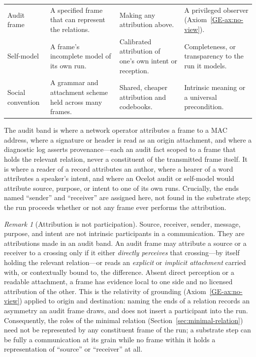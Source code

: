 \documentclass[11pt,a4paper]{article}
\theoremstyle{remark}\newtheorem{remark}[definition]{Remark}
\begin{document}
\begin{table}[t]
\begin{tabular}{@{}>{\raggedright\arraybackslash}p{}>{\raggedright\arraybackslash}p{}>{\raggedright\arraybackslash}p{}>{\raggedright\arraybackslash}p{}@{}}
Audit frame & A specified frame that can represent the relations. & Making any attribution above. & A privileged observer (Axiom~\ref{GE-ax:no-view}).\\
Self-model & A frame's incomplete model of its own run. & Calibrated attribution of one's own intent or reception. & Completeness, or transparency to the run it models.\\
Social convention & A grammar and attachment scheme held across many frames. & Shared, cheaper attribution and codebooks. & Intrinsic meaning or a universal precondition.\\
\bottomrule
\end{tabular}
\end{table}
\endgroup

The audit band is where a network operator attributes a frame to a MAC address,
where a signature or header is read as an origin attachment, and where a
diagnostic log asserts provenance---each an audit fact scoped to a frame that
holds the relevant relation, never a constituent of the transmitted frame itself.
It is where a reader of a record attributes an author, where a hearer of a word
attributes a speaker's intent, and where an Ocelot audit or self-model would
attribute source, purpose, or intent to one of its own runs. Crucially, the ends
named ``sender'' and ``receiver'' are assigned here, not found in the substrate
step; the run proceeds whether or not any frame ever performs the attribution.

\begin{remark}[Attribution is not participation]\label{rem:attribution-not-participation}
Source, receiver, sender, message, purpose, and intent are not intrinsic
participants in a communication. They are attributions made in an audit band.
An audit frame may attribute a source or a receiver to a crossing only if it
either \emph{directly perceives} that crossing---by itself holding the relevant
relation---or reads an \emph{explicit} or \emph{implicit attachment} carried with,
or contextually bound to, the difference. Absent direct perception or a readable
attachment, a frame has evidence local to one side and no licensed attribution of
the other. This is the relativity of grounding (Axiom~\ref{GE-ax:no-view})
applied to origin and destination: naming the ends of a relation records an
asymmetry an audit frame draws, and does not insert a participant into the run.
Consequently, the roles of the minimal relation (Section~\ref{sec:minimal-relation})
need not be represented by any constituent frame of the run; a substrate step can
be fully a communication at its grain while no frame within it holds a
representation of ``source'' or ``receiver'' at all.
\end{remark}
\end{document}
